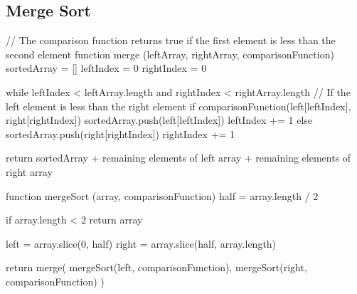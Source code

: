 \documentclass[12pt]{report}
\newenvironment{code}{\ttfamily}{\par}
\begin{document}
\subsection*{Merge Sort}
\bgroup\obeylines
\noindent\begin{code}
// The comparison function returns true if the first element is less than the second element
function merge (leftArray, rightArray, comparisonFunction)
	sortedArray = []
	leftIndex = 0
	rightIndex = 0

	while leftIndex < leftArray.length and rightIndex < rightArray.length
		// If the left element is less than the right element
		if comparisonFunction(left[leftIndex], right[rightIndex])
			sortedArray.push(left[leftIndex])
			leftIndex += 1
		else
			sortedArray.push(right[rightIndex])
			rightIndex += 1

	return sortedArray +
		remaining elements of left array +
		remaining elements of right array

function mergeSort (array, comparisonFunction)
	half = array.length / 2

	if array.length < 2
		return array

	left = array.slice(0, half)
	right = array.slice(half, array.length)

	return merge(
		mergeSort(left, comparisonFunction),
		mergeSort(right, comparisonFunction)
	)
\end{code}
\egroup

\newpage
\end{document}
